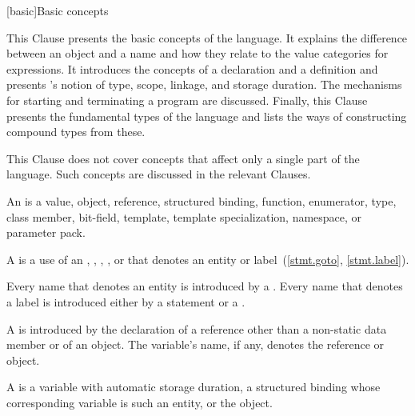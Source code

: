 [basic]{Basic concepts}


\pnum
\begin{note} This Clause presents the basic concepts of the \Cpp{} language.
It explains the difference between an object and a
name and how they relate to the value categories for expressions.
It introduces the concepts of a
declaration and a definition and presents \Cpp{}'s
notion of type, scope, linkage, and
storage duration. The mechanisms for starting and
terminating a program are discussed. Finally, this Clause presents the
fundamental types of the language and lists the ways of constructing
compound types from these.\end{note}

\pnum
\begin{note} This Clause does not cover concepts that affect only a single
part of the language. Such concepts are discussed in the relevant
Clauses. \end{note}

\pnum
{}%
%
%
%
%
%
An  is a value, object, reference,
structured binding,
function, enumerator, type,
class member, bit-field, template, template specialization, namespace, or
parameter pack.

\pnum
A  is a use of an ,
,
,
, or
 that denotes an entity or
label~(\ref{stmt.goto}, \ref{stmt.label}).

\pnum
Every name that denotes an entity is introduced by a
. Every name that denotes a label is introduced
either by a  statement or a
.

\pnum
A  is introduced by the
declaration of
a reference other than a non-static data member or of
an object. The variable's name, if any, denotes the reference or object.

\pnum
A  is a variable with
automatic storage duration,
a structured binding
whose corresponding variable is such an entity,
or the  object.

